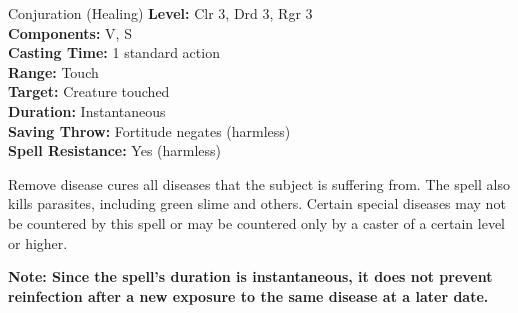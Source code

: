 {Conjuration (Healing)}
{
	\textbf{Level:}
	Clr 3, Drd 3, Rgr 3\\
	\textbf{Components:}
	V, S\\
	\textbf{Casting Time:}
	1 standard action\\
	\textbf{Range:}
	Touch\\
	\textbf{Target:}
	Creature touched\\
	\textbf{Duration:}
	Instantaneous\\
	\textbf{Saving Throw:}
	Fortitude negates (harmless)\\
	\textbf{Spell Resistance:}
	Yes (harmless)\\
}
{
	Remove disease cures all diseases that the subject is suffering from. The spell also kills parasites, including green slime and others. Certain special diseases may not be countered by this spell or may be countered only by a caster of a certain level or higher.

	\textbf{Note: Since the spell's duration is instantaneous, it does not prevent reinfection after a new exposure to the same disease at a later date.}

}
